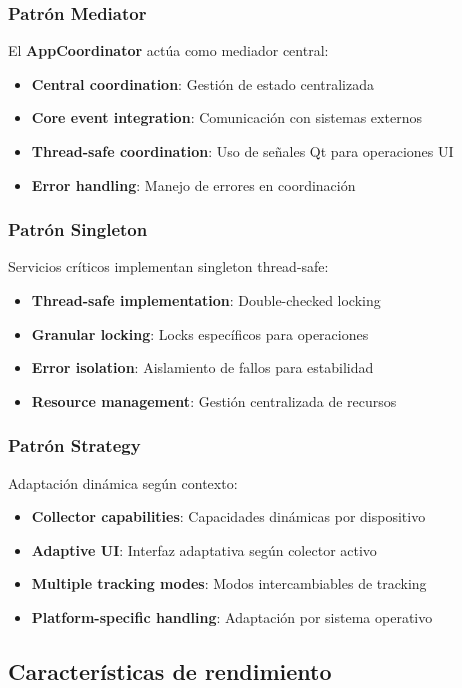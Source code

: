 \subsubsection{Patrón Mediator}
El \textbf{AppCoordinator} actúa como mediador central:
\begin{itemize}
    \item \textbf{Central coordination}: Gestión de estado centralizada
    \item \textbf{Core event integration}: Comunicación con sistemas externos
    \item \textbf{Thread-safe coordination}: Uso de señales Qt para operaciones UI
    \item \textbf{Error handling}: Manejo de errores en coordinación
\end{itemize}

\subsubsection{Patrón Singleton}
Servicios críticos implementan singleton thread-safe:
\begin{itemize}
    \item \textbf{Thread-safe implementation}: Double-checked locking
    \item \textbf{Granular locking}: Locks específicos para operaciones
    \item \textbf{Error isolation}: Aislamiento de fallos para estabilidad
    \item \textbf{Resource management}: Gestión centralizada de recursos
\end{itemize}

\subsubsection{Patrón Strategy}
Adaptación dinámica según contexto:
\begin{itemize}
    \item \textbf{Collector capabilities}: Capacidades dinámicas por dispositivo
    \item \textbf{Adaptive UI}: Interfaz adaptativa según colector activo
    \item \textbf{Multiple tracking modes}: Modos intercambiables de tracking
    \item \textbf{Platform-specific handling}: Adaptación por sistema operativo
\end{itemize}

\subsection{Características de rendimiento}
\label{subsec:rendimiento_input_collector}

